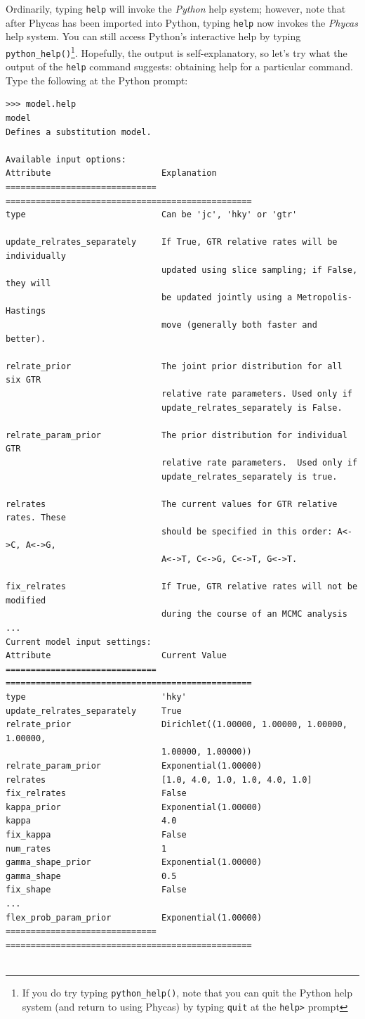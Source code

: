 \documentclass[10pt]{article}
\newcommand{\code}[1]{{\tt #1}}					%
\newcommand{\cmd}[1]{{\tt \small #1}\index{#1}}	%
\begin{document}
Ordinarily, typing \cmd{help} will invoke the {\em Python} help system; however, note that after Phycas has been imported into Python, typing \cmd{help} now invokes the {\em Phycas} help system. You can still access Python's interactive help by typing \cmd{python\_help()}\footnote{If you do try typing \cmd{python\_help()}, note that you can quit the Python help system (and return to using Phycas) by typing \cmd{quit} at the \code{help>} prompt}. Hopefully, the output is self-explanatory, so let's try what the output of the \cmd{help} command suggests: obtaining help for a particular command. Type the following at the Python prompt:
\begin{verbatim}
>>> model.help
model
Defines a substitution model.

Available input options:
Attribute                      Explanation
============================== =================================================
type                           Can be 'jc', 'hky' or 'gtr'

update_relrates_separately     If True, GTR relative rates will be individually
                               updated using slice sampling; if False, they will
                               be updated jointly using a Metropolis-Hastings
                               move (generally both faster and better).

relrate_prior                  The joint prior distribution for all six GTR
                               relative rate parameters. Used only if
                               update_relrates_separately is False.

relrate_param_prior            The prior distribution for individual GTR
                               relative rate parameters.  Used only if
                               update_relrates_separately is true.

relrates                       The current values for GTR relative rates. These
                               should be specified in this order: A<->C, A<->G,
                               A<->T, C<->G, C<->T, G<->T.

fix_relrates                   If True, GTR relative rates will not be modified
                               during the course of an MCMC analysis
...                               
Current model input settings:
Attribute                      Current Value
============================== =================================================
type                           'hky'
update_relrates_separately     True
relrate_prior                  Dirichlet((1.00000, 1.00000, 1.00000, 1.00000,
                               1.00000, 1.00000))
relrate_param_prior            Exponential(1.00000)
relrates                       [1.0, 4.0, 1.0, 1.0, 4.0, 1.0]
fix_relrates                   False
kappa_prior                    Exponential(1.00000)
kappa                          4.0
fix_kappa                      False
num_rates                      1
gamma_shape_prior              Exponential(1.00000)
gamma_shape                    0.5
fix_shape                      False
...
flex_prob_param_prior          Exponential(1.00000)
============================== =================================================


\end{verbatim}
\end{document}
